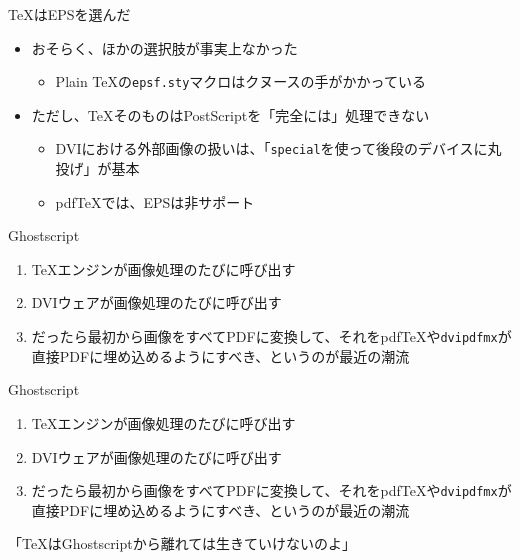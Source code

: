 \documentclass[14pt,dvipdfmx,uplatex]{beamer}
\begin{document}
\begin{frame}[t,fragile=singleslide]{\inhibitglue \TeX{}はEPSを選んだ}
  \sffamily
  \begin{itemize}
    \item おそらく、ほかの選択肢が事実上なかった
      \begin{itemize}
        \item Plain \TeX{}の\texttt{epsf.sty}マクロはクヌースの手がかかっている
      \end{itemize}
    \item ただし、\TeX{}そのものはPostScriptを「完全には」処理できない
      \begin{itemize}
        \item DVIにおける外部画像の扱いは、「\texttt{special}を使って後段のデバイスに丸投げ」が基本
        \item pdf\TeX{}では、EPSは非サポート
     \end{itemize}
  \end{itemize}
\end{frame}

\begin{frame}[t,fragile=singleslide]{\inhibitglue Ghostscript}
  \sffamily
  \begin{enumerate}
    \item \TeX{}エンジンが画像処理のたびに呼び出す
    \item DVIウェアが画像処理のたびに呼び出す
    \item だったら最初から画像をすべてPDFに変換して、それをpdf\TeX{}や\texttt{dvipdfmx}が直接PDFに埋め込めるようにすべき、というのが最近の潮流
  \end{enumerate}
\end{frame}

\begin{frame}[t,fragile=singleslide]{\inhibitglue Ghostscript}
  \sffamily
  \begin{enumerate}
    \item \TeX{}エンジンが画像処理のたびに呼び出す
    \item DVIウェアが画像処理のたびに呼び出す
    \item だったら最初から画像をすべてPDFに変換して、それをpdf\TeX{}や\texttt{dvipdfmx}が直接PDFに埋め込めるようにすべき、というのが最近の潮流
  \end{enumerate}
  
  \color{black}\yasagoth
  \begin{center}
  「\TeX{}はGhostscriptから離れては生きていけないのよ」
  \end{center}
\end{frame}
\end{document}
